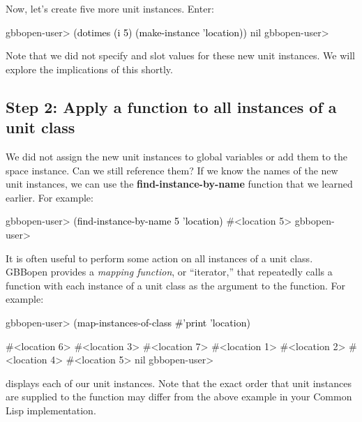 \documentclass[10pt,twoside,english,pdftex]{article}
\begin{document}
Now, let's create five more  unit instances.  Enter:
%
%
%
\W\supp
\begin{example}
\textcolor{darkergray}{%
  gbbopen-user> \textcolor{black}{(dotimes (i 5) (make-instance 'location))}
  nil
  gbbopen-user>}
\end{example}
%
Note that we did not specify  and  slot values for these new
unit instances.  We will explore the implications of this shortly.

\subsection*{Step 2: Apply a function to all instances of a unit class}

%
%
%
%
We did not assign the new  unit instances to global variables
or add them to the  space instance.  Can we still reference
them?  If we know the names of the new unit instances, we can use the
\textbf{find-instance-by-name} function that we learned earlier.  For example:
%
\W\supp
\begin{example}
\textcolor{darkergray}{%
  gbbopen-user> \textcolor{black}{(find-instance-by-name 5 'location)}
  #<location 5>
  gbbopen-user>}
\end{example}

%
%
%
It is often useful to perform some action on all instances of a unit class.
GBBopen provides a \textit{mapping function}, or ``iterator,'' that repeatedly
calls a function with each instance of a unit class as the argument to the
function.  For example:
%
\W\supp
\begin{example}
\textcolor{darkergray}{%
  gbbopen-user> \textcolor{black}{(map-instances-of-class #'print 'location)}

  #<location 6> 
  #<location 3> 
  #<location 7> 
  #<location 1> 
  #<location 2> 
  #<location 4> 
  #<location 5> 
  nil
  gbbopen-user>}
\end{example}
%
displays each of our  unit instances.  Note that the exact
order that  unit instances are supplied to the 
function may differ from the above example in your Common Lisp implementation.
\end{document}
